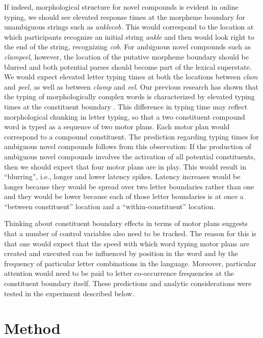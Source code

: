 \documentclass[output=paper]{langsci/langscibook}
\begin{document}
If indeed, morphological structure for novel compounds is evident in online typing, we should see elevated response times at the morpheme boundary for unambiguous strings such as \textit{anklecob.} This would correspond to the location at which participants recognize an initial string \textit{ankle} and then would look right to the end of the string, recognizing \textit{cob}. For ambiguous novel compounds such as \textit{clampeel}, however, the location of the putative morpheme boundary should be blurred and both potential parses should become part of the lexical superstate.  We would expect elevated letter typing times at both the locations between \textit{clam} and \textit{peel}, as well as between \textit{clamp} and \textit{eel}.  %
Our previous research has shown that the typing of morphologically complex words is characterized by elevated typing times at the constituent boundary \citep{LibbenCurtissWeber2015,LibbenEtAl2016}. This difference in typing time may reflect morphological chunking in letter typing, so that a two constituent compound word is typed as a sequence of two motor plans. Each motor plan would correspond to a compound constituent. The prediction regarding typing times for ambiguous novel compounds follows from this observation: If the production of ambiguous novel compounds involves the activation of all potential constituents, then we should expect that four motor plans are in play.  This would result in ``blurring'', i.e., longer and lower latency spikes. Latency increases would be longer because they would be spread over two letter boundaries rather than one and they would be lower because each of those letter boundaries is at once a ``between constituent'' location and a ``within-constituent'' location.

Thinking about constituent boundary effects in terms of motor plans suggests that a number of control variables also need to be tracked.  The reason for this is that one would expect that the speed with which word typing motor plans are created and executed can be influenced by position in the word and by the frequency of particular letter combinations in the language. Moreover, particular attention would need to be paid to letter co-occurrence frequencies at the constituent boundary itself.  These predictions and analytic considerations were tested in the experiment described below.

\section{Method}\label{sec:libben:2}
\end{document}
